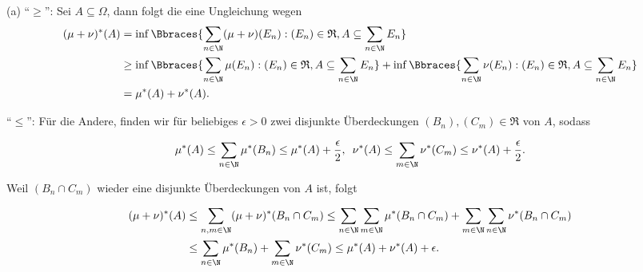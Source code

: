 \begin{solution}

(a) \enquote{$\geq$}: Sei $A \subseteq \Omega$, dann folgt die eine Ungleichung wegen \\

\begin{align*}
  (\mu + \nu)^\ast(A)
  & =
    \inf \Bbraces{\sum_{n \in \N} (\mu + \nu)(E_n): (E_n) \in \mathfrak{R}, A \subseteq \sum_{n \in \N} E_n} \\
  & \geq
    \inf \Bbraces{\sum_{n \in \N} \mu(E_n): (E_n) \in \mathfrak{R}, A \subseteq \sum_{n \in \N} E_n} +
    \inf \Bbraces{\sum_{n \in \N} \nu(E_n): (E_n) \in \mathfrak{R}, A \subseteq \sum_{n \in \N} E_n} \\
  & =
    \mu^\ast(A) + \nu^\ast(A).
\end{align*}

\enquote{$\leq$}: Für die Andere, finden wir für beliebiges $\epsilon > 0$ zwei disjunkte Überdeckungen $(B_n), (C_m) \in \mathfrak{R}$ von $A$, sodass

\begin{align*}
  \mu^\ast(A) \leq \sum_{n \in \N} \mu^\ast(B_n) \leq \mu^\ast(A) + \frac{\epsilon}{2}, \enspace
  \nu^\ast(A) \leq \sum_{m \in \N} \nu^\ast(C_m) \leq \nu^\ast(A) + \frac{\epsilon}{2}.
\end{align*}

Weil $(B_n \cap C_m)$ wieder eine disjunkte Überdeckungen von $A$ ist, folgt

\begin{align*}
  (\mu + \nu)^\ast(A)
  & \leq
    \sum_{n, m \in \N} (\mu + \nu)^\ast(B_n \cap C_m)
    \leq
    \sum_{n \in \N} \sum_{m \in \N} \mu^\ast(B_n \cap C_m) +
    \sum_{m \in \N} \sum_{n \in \N} \nu^\ast(B_n \cap C_m) \\
  & \leq
    \sum_{n \in \N} \mu^\ast(B_n) +
    \sum_{m \in \N} \nu^\ast(C_m)
    \leq
    \mu^\ast(A) + \nu^\ast(A) + \epsilon.
\end{align*}

\end{solution}

